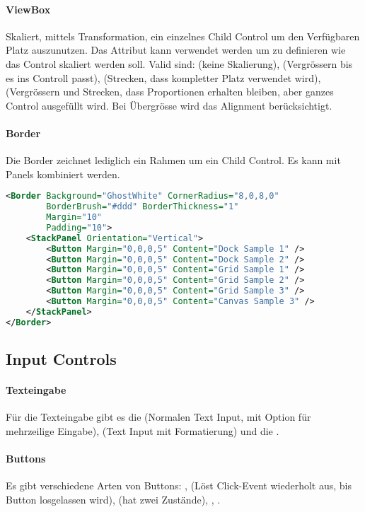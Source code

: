 \paragraph{ViewBox} Skaliert, mittels Transformation, ein einzelnes Child Control um den Verfügbaren Platz auszunutzen. Das Attribut  kann verwendet werden um zu definieren wie das Control skaliert werden soll. Valid sind:  (keine Skalierung),  (Vergrössern bis es ins Controll passt),  (Strecken, dass kompletter Platz verwendet wird),  (Vergrössern und Strecken, dass Proportionen erhalten bleiben, aber ganzes Control ausgefüllt wird. Bei Übergrösse wird das Alignment berücksichtigt.
\paragraph{Border} Die Border zeichnet lediglich ein Rahmen um ein Child Control. Es kann mit Panels kombiniert werden.
\begin{lstlisting}[language=xml]
<Border Background="GhostWhite" CornerRadius="8,0,8,0"
        BorderBrush="#ddd" BorderThickness="1"
        Margin="10"
        Padding="10">
    <StackPanel Orientation="Vertical">
        <Button Margin="0,0,0,5" Content="Dock Sample 1" />
        <Button Margin="0,0,0,5" Content="Dock Sample 2" />
        <Button Margin="0,0,0,5" Content="Grid Sample 1" />
        <Button Margin="0,0,0,5" Content="Grid Sample 2" />
        <Button Margin="0,0,0,5" Content="Grid Sample 3" />
        <Button Margin="0,0,0,5" Content="Canvas Sample 3" />
    </StackPanel>
</Border>
\end{lstlisting}
\subsection{Input Controls}
\paragraph{Texteingabe} Für die Texteingabe gibt es die  (Normalen Text Input, mit Option für mehrzeilige Eingabe),  (Text Input mit Formatierung) und die .
\paragraph{Buttons} Es gibt verschiedene Arten von Buttons: ,  (Löst Click-Event wiederholt aus, bis Button losgelassen wird),  (hat zwei Zustände), , .
